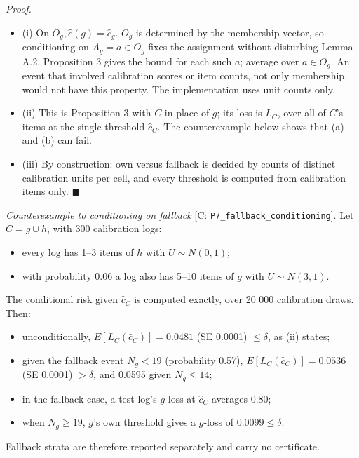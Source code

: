 \documentclass{ieeeaccess}
\begin{document}
\emph{Proof.}

\begin{itemize}
\item (i) On $O_{g}, \hat{c}(g) = \hat{c}_{g}$. $O_{g}$ is determined by the membership vector, so conditioning on $A_{g} = a \in O_{g}$ fixes the assignment without disturbing Lemma A.2. Proposition 3 gives the bound for each such $a$; average over $a \in O_{g}$. An event that involved calibration scores or item counts, not only membership, would not have this property. The implementation uses unit counts only.
\item (ii) This is Proposition 3 with $C$ in place of $g$; its loss is $L_{C}$, over all of $C$'s items at the single threshold $\hat{c}_{C}$. The counterexample below shows that (a) and (b) can fail.
\item (iii) By construction: own versus fallback is decided by counts of distinct calibration units per cell, and every threshold is computed from calibration items only. $\blacksquare$
\end{itemize}

\emph{Counterexample to conditioning on fallback} [C: \texttt{P7\_fallback\_conditioning}]. Let $C = g \cup h$, with 300 calibration logs:

\begin{itemize}
\item every log has 1--3 items of $h$ with $U \sim N(0, 1)$;
\item with probability 0.06 a log also has 5--10 items of $g$ with $U \sim N(3, 1)$.
\end{itemize}

The conditional risk given $\hat{c}_{C}$ is computed exactly, over 20 000 calibration draws. Then:

\begin{itemize}
\item unconditionally, $E[L_{C}(\hat{c}_{C})] = 0.0481$ (SE 0.0001) $\leq \delta$, as (ii) states;
\item given the fallback event $N_{g} < 19$ (probability 0.57), $E[L_{C}(\hat{c}_{C})] = 0.0536$ (SE 0.0001) $> \delta$, and 0.0595 given $N_{g} \leq 14$;
\item in the fallback case, a test log's $g$-loss at $\hat{c}_{C}$ averages 0.80;
\item when $N_{g} \geq 19$, $g$'s own threshold gives a $g$-loss of $0.0099 \leq \delta$.
\end{itemize}

Fallback strata are therefore reported separately and carry no certificate.
\end{document}
